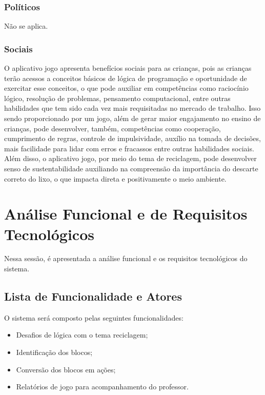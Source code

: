         \subsubsection{Políticos}
        Não se aplica.

        \subsubsection{Sociais}
        O aplicativo jogo apresenta benefícios sociais para as crianças, pois as crianças terão acessos a conceitos básicos de lógica de programação e oportunidade de exercitar esse conceitos, o que pode auxiliar em competências como raciocínio lógico, resolução de problemas, pensamento computacional, entre outras habilidades que tem sido cada vez mais requisitadas no mercado de trabalho. 
        Isso sendo proporcionado por um jogo, além de gerar maior engajamento no ensino de crianças, pode desenvolver, também, competências como cooperação, cumprimento de regras, controle de impulsividade, auxílio na tomada de decisões, mais facilidade para lidar com erros e fracassos entre outras habilidades sociais.
        Além disso, o aplicativo jogo, por meio do tema de reciclagem, pode desenvolver senso de sustentabilidade auxiliando na compreensão da importância do descarte correto do lixo, o que impacta direta e positivamente  o meio ambiente.

\section{Análise Funcional e de Requisitos Tecnológicos}
    Nessa sessão, é apresentada a análise funcional e os requisitos tecnológicos do sistema.

    \subsection{Lista de Funcionalidade e Atores}
    O sistema será composto  pelas seguintes funcionalidades:
    \begin{itemize}
        \item Desafios de lógica com o tema reciclagem;
        \item Identificação dos blocos;
        \item Conversão dos blocos em ações;
        \item Relatórios de jogo para acompanhamento do professor.
    \end{itemize}
    
